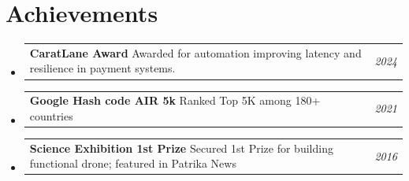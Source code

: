 \documentclass[a4paper,11pt]{article}
\makeatletter
\newcommand{\resumePOR}[3]{
\vspace{0.5mm}\item
    \begin{tabular*}{0.97\textwidth}[t]{l@{\extracolsep{\fill}}r}
        \textbf{#1}\hspace{0.3mm}#2 & \textit{\small{#3}} 
    \end{tabular*}
    \vspace{-2mm}
}
\newcommand{\resumeSubheading}[4]{
\vspace{0.5mm}\item
    \begin{tabular*}{0.98\textwidth}[t]{l@{\extracolsep{\fill}}r}
        \textbf{#1} & \textit{\footnotesize{#4}} \\
        \textit{\footnotesize{#3}} &  \footnotesize{#2}\\
    \end{tabular*}
    \vspace{-2.4mm}
}
\newcommand{\resumeSubHeadingListStart}{\begin{itemize}[leftmargin=*,labelsep=0mm]}
\newcommand{\resumeItemListStart}{\begin{justify}\begin{itemize}[leftmargin=3ex, rightmargin=2ex, noitemsep,labelsep=1.2mm,itemsep=0mm]\small}
\newcommand{\resumeSubHeadingListEnd}{\end{itemize}\vspace{2mm}}
\newcommand{\resumeItemListEnd}{\end{itemize}\end{justify}\vspace{-2mm}}
\makeatother
\begin{document}





\section{\textbf{Achievements}}
\vspace{-0.4mm}
\resumeSubHeadingListStart
\resumePOR{ CaratLane Award}
{ Awarded for automation improving latency and resilience in payment systems. }
{ 2024}
\resumePOR{ Google Hash code AIR 5k } %
    {Ranked Top 5K among 180+ countries  } %
{ 2021} %
    
\resumePOR{ Science Exhibition 1st Prize } %
    {Secured 1st Prize for building functional drone; featured in Patrika News } %
{ 2016} %

\resumeSubHeadingListEnd
\vspace{-5mm}



\end{document}
